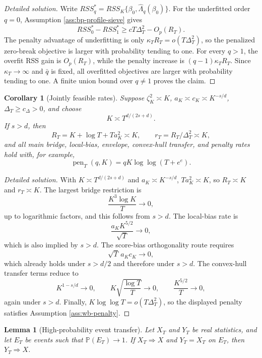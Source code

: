 \documentclass[12pt]{article}
\numberwithin{equation}{section}
\newtheorem{lemma}{Lemma}
\newtheorem{corollary}{Corollary}
\theoremstyle{definition}
\newcommand{\Pp}{\mathbb P}
\begin{document}
\begin{proof}[Detailed solution]
Write \(RSS_q^*=RSS_K\{\beta_0,\widehat\Lambda_q(\beta_0)\}\).  For the
underfitted order \(q=0\), Assumption \ref{ass:bp-profile-sieve} gives
\[
    RSS_0^*-RSS_1^*
    \geq cT\Delta_T^2-O_p(R_T).
\]
The penalty advantage of underfitting is only \(\kappa_TR_T=o(T\Delta_T^2)\),
so the penalized zero-break objective is larger with probability tending to one.
For every \(q>1\), the overfit RSS gain is \(O_p(R_T)\), while the penalty
increase is \((q-1)\kappa_TR_T\).  Since \(\kappa_T\to\infty\) and \(\bar q\)
is fixed, all overfitted objectives are larger with probability tending to one.
A finite union bound over \(q\neq1\) proves the claim.
\end{proof}
\begin{corollary}[Jointly feasible rates]
\label{cor:jointly-feasible-rates}
Suppose \(\zeta_K^2\asymp K\), \(a_K\asymp c_K\asymp K^{-s/d}\),
\(\Delta_T\geq c_\Delta>0\), and choose
\[
    K\asymp T^{d/(2s+d)}.
\]
If \(s>d\), then
\[
    R_T=K+\log T+Ta_K^2\asymp K,
    \qquad
    r_T=R_T/\Delta_T^2\asymp K,
\]
and all main bridge, local-bias, envelope, convex-hull transfer, and penalty
rates hold with, for example,
\[
    \operatorname{pen}_T(q,K)=qK\log\log(T+e^e).
\]
\end{corollary}

\begin{proof}[Detailed solution]
With \(K\asymp T^{d/(2s+d)}\) and \(a_K\asymp K^{-s/d}\),
\(Ta_K^2\asymp K\), so \(R_T\asymp K\) and \(r_T\asymp K\).  The largest
bridge restriction is
\[
    \frac{K^3\log K}{T}\to0,
\]
up to logarithmic factors, and this follows from \(s>d\).  The local-bias rate
is
\[
    \frac{a_K K^{5/2}}{\sqrt T}\to0,
\]
which is also implied by \(s>d\).  The score-bias orthogonality route requires
\[
    \sqrt T\,a_Kc_K\to0,
\]
which already holds under \(s>d/2\) and therefore under \(s>d\).  The
convex-hull transfer terms reduce to
\[
    K^{1-s/d}\to0,
    \qquad
    K\sqrt{\frac{\log T}{T}}\to0,
    \qquad
    \frac{K^{5/2}}{T}\to0,
\]
again under \(s>d\).  Finally,
\(K\log\log T=o(T\Delta_T^2)\), so the displayed penalty satisfies Assumption
\ref{ass:wb-penalty}.
\end{proof}
\begin{lemma}[High-probability event transfer]
\label{lem:wb-event-transfer}
Let \(X_T\) and \(Y_T\) be real statistics, and let \(E_T\) be events
such that \(\Pp(E_T)\to1\).  If \(X_T\Rightarrow X\) and
\(Y_T=X_T\) on \(E_T\), then \(Y_T\Rightarrow X\).
\end{lemma}
\end{document}
